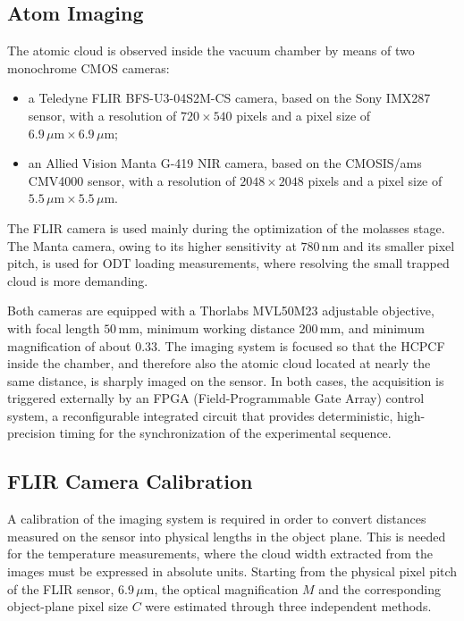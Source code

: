 \subsection{Atom Imaging}

The atomic cloud is observed inside the vacuum chamber by means of two monochrome CMOS cameras:

\begin{itemize}
    \item a Teledyne FLIR BFS-U3-04S2M-CS camera, based on the Sony IMX287 sensor, with a resolution of $720\times540$ pixels and a pixel size of $6.9\,\mu\mathrm{m}\times6.9\,\mu\mathrm{m}$;
    \item an Allied Vision Manta G-419 NIR camera, based on the CMOSIS/ams CMV4000 sensor, with a resolution of $2048\times2048$ pixels and a pixel size of $5.5\,\mu\mathrm{m}\times5.5\,\mu\mathrm{m}$.
\end{itemize}

The FLIR camera is used mainly during the optimization of the molasses stage. The Manta camera, owing to its higher sensitivity at $780\,\mathrm{nm}$ and its smaller pixel pitch, is used for ODT loading measurements, where resolving the small trapped cloud is more demanding.

Both cameras are equipped with a Thorlabs MVL50M23 adjustable objective, with focal length $50\,\mathrm{mm}$, minimum working distance $200\,\mathrm{mm}$, and minimum magnification of about $0.33$. The imaging system is focused so that the HCPCF inside the chamber, and therefore also the atomic cloud located at nearly the same distance, is sharply imaged on the sensor. In both cases, the acquisition is triggered externally by an FPGA (Field-Programmable Gate Array) control system, a reconfigurable integrated circuit that provides deterministic, high-precision timing for the synchronization of the experimental sequence.

\subsection{FLIR Camera Calibration}

A calibration of the imaging system is required in order to convert distances measured on the sensor into physical lengths in the object plane. This is needed for the temperature measurements, where the cloud width extracted from the images must be expressed in absolute units. Starting from the physical pixel pitch of the FLIR sensor, $6.9\,\mu\mathrm{m}$, the optical magnification $M$ and the corresponding object-plane pixel size $C$ were estimated through three independent methods.

